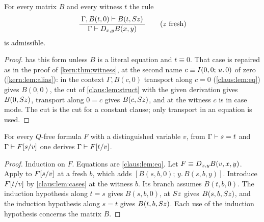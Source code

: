 \begin{lemma}
\label{claus:lem:cases}
For every matrix $B$ and every witness $t$ the rule
\[
 \dfrac{\;\Gamma,B(t,0)\vdash B(t,S z)\;}{\;\Gamma\vdash D_{x,y}B(x,y)\;}
 \qquad(z\text{ fresh})
\]
is admissible.
\end{lemma}
\begin{proof}
 has this form unless $B$ is a literal equation and
$t\equiv 0$. That case is repaired as in the proof of
\cref{kern:thm:witness}, at the second name $c\equiv I(0,0;\,u.\,0)$ of
zero (\cref{kern:lem:alias}): in the context $\Gamma,B(c,0)$ transport along
$c=0$ (\cref{claus:lem:eq}) gives $B(0,0)$, the cut of
\cref{claus:lem:struct} with the given derivation gives $B(0,S z)$,
transport along $0=c$ gives $B(c,S z)$, and  at the
witness $c$ is in case mode. The cut is the cut for a constant clause; only
transport in an equation is used.
\end{proof}

\begin{lemma}
\label{claus:lem:ftransport}
For every $Q$-free formula $F$ with a distinguished variable $v$, from
$\Gamma\vdash s=t$ and $\Gamma\vdash F[s/v]$ one derives
$\Gamma\vdash F[t/v]$.
\end{lemma}
\begin{proof}
Induction on $F$. Equations are \cref{claus:lem:eq}. Let
$F\equiv D_{x,y}B(v,x,y)$. Apply  to $F[s/v]$ at a
fresh $b$, which adds $[B(s,b,0);\,y.\,B(s,b,y)]$. Introduce
$F[t/v]$ by \cref{claus:lem:cases} at the witness $b$. Its branch
assumes $B(t,b,0)$. The induction hypothesis along $t=s$ gives $B(s,b,0)$,
 at $S z$ gives $B(s,b,S z)$, and the induction
hypothesis along $s=t$ gives $B(t,b,S z)$. Each use of the induction
hypothesis concerns the matrix $B$.
\end{proof}

